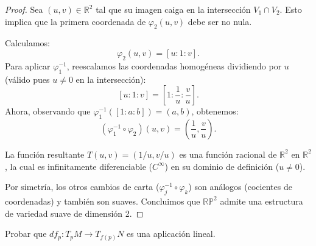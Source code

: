 \documentclass{article}
\newcommand{\RP}{\mathbb{R}\mathbb{P}}
\newenvironment{theorem}[2][Ejercicio]{\begin{trivlist}
\item[\hskip \labelsep {\bfseries #1}\hskip \labelsep {\bfseries #2.}]}{\end{trivlist}}
\begin{document}
\begin{proof}
    Sea \((u,v) \in \mathbb{R}^2\) tal que su imagen caiga en la intersección \(V_1 \cap V_2\). Esto implica que la primera coordenada de \(\varphi_2(u,v)\) debe ser no nula.

    Calculamos:
    \[
        \varphi_2(u, v) = [u : 1 : v].
    \]
    Para aplicar \( \varphi_1^{-1}\), reescalamos las coordenadas homogéneas dividiendo por \(u\) (válido pues \(u \neq 0\) en la intersección):
    \[
        [u : 1 : v] = \left[ 1 : \frac{1}{u} : \frac{v}{u} \right].
    \]
    Ahora, observando que \(\varphi_1^{-1}([1:a:b]) = (a,b)\), obtenemos:
    \[
        (\varphi_1^{-1} \circ \varphi_2)(u, v) = \left( \frac{1}{u}, \frac{v}{u} \right).
    \]

    La función resultante \(T(u,v) = (1/u, v/u)\) es una función racional de \(\mathbb{R}^2\) en \(\mathbb{R}^2\), la cual es infinitamente diferenciable (\( C^\infty \)) en su dominio de definición (\(u \neq 0\)).

    Por simetría, los otros cambios de carta (\(\varphi_j^{-1} \circ \varphi_k\)) son análogos (cocientes de coordenadas) y también son suaves. Concluimos que \(\RP^2\) admite una estructura de variedad suave de dimensión 2.
\end{proof}

\clearpage

\begin{theorem}{2}
    Probar que \( df_p : T_p M \to T_{f(p)} N \) es una aplicación lineal.
\end{theorem}
\end{document}
